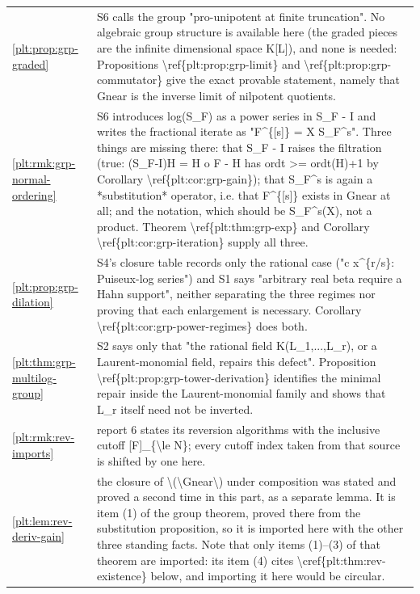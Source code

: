 \documentclass[11pt,oneside]{article}
\theoremstyle{plain}
\theoremstyle{definition}
\theoremstyle{remark}
\begin{document}
\begin{longtable}{@{}p{} p{}@{}}
\cref{plt:prop:grp-graded} & S6 calls the group "pro-unipotent at finite truncation". No algebraic group structure is available here (the graded pieces are the infinite dimensional space K[L]), and none is needed: Propositions \textbackslash ref\{plt:prop:grp-limit\} and \textbackslash ref\{plt:prop:grp-commutator\} give the exact provable statement, namely that Gnear is the inverse limit of nilpotent quotients.\\
\cref{plt:rmk:grp-normal-ordering} & S6 introduces log(S\_F) as a power series in S\_F - I and writes the fractional iterate as "F\textasciicircum \{[s]\} = X S\_F\textasciicircum s". Three things are missing there: that S\_F - I raises the filtration (true: (S\_F-I)H = H o F - H has ordt >= ordt(H)+1 by Corollary \textbackslash ref\{plt:cor:grp-gain\}); that S\_F\textasciicircum s is again a *substitution* operator, i.e. that F\textasciicircum \{[s]\} exists in Gnear at all; and the notation, which should be S\_F\textasciicircum s(X), not a product. Theorem \textbackslash ref\{plt:thm:grp-exp\} and Corollary \textbackslash ref\{plt:cor:grp-iteration\} supply all three.\\
\cref{plt:prop:grp-dilation} & S4's closure table records only the rational case ("c x\textasciicircum \{r/s\}: Puiseux-log series") and S1 says "arbitrary real beta require a Hahn support", neither separating the three regimes nor proving that each enlargement is necessary. Corollary \textbackslash ref\{plt:cor:grp-power-regimes\} does both.\\
\cref{plt:thm:grp-multilog-group} & S2 says only that "the rational field K(L\_1,...,L\_r), or a Laurent-monomial field, repairs this defect". Proposition \textbackslash ref\{plt:prop:grp-tower-derivation\} identifies the minimal repair inside the Laurent-monomial family and shows that L\_r itself need not be inverted.\\
\cref{plt:rmk:rev-imports} & report 6 states its reversion algorithms with the inclusive cutoff [F]\_\{\textbackslash le N\}; every cutoff index taken from that source is shifted by one here.\\
\cref{plt:lem:rev-deriv-gain} & the closure of \textbackslash (\textbackslash Gnear\textbackslash ) under composition was stated and proved a second time in this part, as a separate lemma. It is item (1) of the group theorem, proved there from the substitution proposition, so it is imported here with the other three standing facts. Note that only items (1)--(3) of that theorem are imported: its item (4) cites \textbackslash cref\{plt:thm:rev-existence\} below, and importing it here would be circular.\\

\end{longtable}
\end{document}
